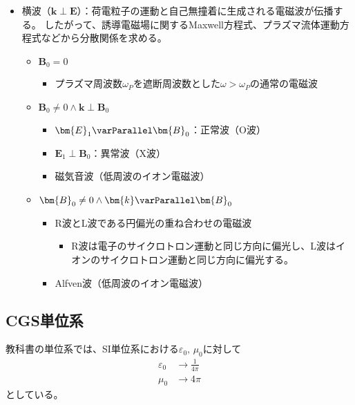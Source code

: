 \begin{itemize}
\begin{itemize}
\begin{itemize}
\begin{itemize}
			                  \end{itemize}
		            \end{itemize}
	      \end{itemize}
	\item 横波（$\bm{k}\perp \bm{E}$）：{\color{red}荷電粒子の運動と自己無撞着に生成される電磁波}が伝播する。
	      したがって、{\color{red}誘導電磁場に関するMaxwell方程式}、{\color{red}プラズマ流体運動方程式}などから分散関係を求める。
	      \begin{itemize}
		      \item $\bm{B}_0 = 0$
		            \begin{itemize}
			            \item プラズマ周波数$\omega_P$を遮断周波数とした$\omega > \omega_P$の通常の電磁波
		            \end{itemize}
		      \item $\bm{B}_0 \neq 0 \wedge \bm{k}\perp \bm{B}_0$
		            \begin{itemize}
			            \item $\bm{E}_1 \varParallel \bm{B}_0$：正常波（O波）
			            \item $\bm{E}_1 \perp \bm{B}_0$：異常波（X波）
			            \item 磁気音波（低周波のイオン電磁波）
		            \end{itemize}
		      \item $\bm{B}_0 \neq 0 \wedge \bm{k}\varParallel \bm{B}_0$
		            \begin{itemize}
			            \item R波とL波である円偏光の重ね合わせの電磁波
			                  \begin{itemize}
				                  \item R波は電子のサイクロトロン運動と同じ方向に偏光し、L波はイオンのサイクロトロン運動と同じ方向に偏光する。
			                  \end{itemize}
			            \item Alfven波（低周波のイオン電磁波）
		            \end{itemize}
	      \end{itemize}
\end{itemize}


\subsection{CGS単位系}
教科書の単位系では、SI単位系における$\varepsilon_0,\,\mu_0$に対して
\begin{align}
	\varepsilon_0 & \to \frac{1}{4\pi} \\
	\mu_0         & \to 4\pi
\end{align}
としている。

